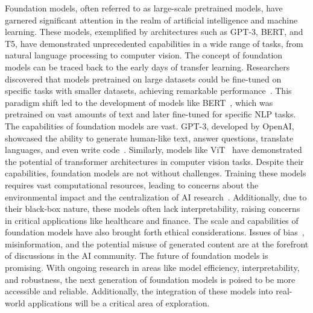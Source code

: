 \documentclass[withindex,glossary,firstyr]{cam-thesis}
\begin{document}
Foundation models, often referred to as large-scale pretrained models, have garnered significant attention in the realm of artificial intelligence and machine learning. These models, exemplified by architectures such as GPT-3, BERT, and T5, have demonstrated unprecedented capabilities in a wide range of tasks, from natural language processing to computer vision.
The concept of foundation models can be traced back to the early days of transfer learning. Researchers discovered that models pretrained on large datasets could be fine-tuned on specific tasks with smaller datasets, achieving remarkable performance~\cite{yosinski2014transferable}. This paradigm shift led to the development of models like BERT~\cite{mBERT}, which was pretrained on vast amounts of text and later fine-tuned for specific NLP tasks.
The capabilities of foundation models are vast. GPT-3, developed by OpenAI, showcased the ability to generate human-like text, answer questions, translate languages, and even write code~\cite{brown2020language}. Similarly, models like ViT~\cite{dosovitskiy2020image} have demonstrated the potential of transformer architectures in computer vision tasks.
Despite their capabilities, foundation models are not without challenges. Training these models requires vast computational resources, leading to concerns about the environmental impact and the centralization of AI research~\cite{strubell2019energy}. Additionally, due to their black-box nature, these models often lack interpretability, raising concerns in critical applications like healthcare and finance.
The scale and capabilities of foundation models have also brought forth ethical considerations. Issues of bias~\cite{StochasticParrots}, misinformation, and the potential misuse of generated content are at the forefront of discussions in the AI community.
The future of foundation models is promising. With ongoing research in areas like model efficiency, interpretability, and robustness, the next generation of foundation models is poised to be more accessible and reliable. Additionally, the integration of these models into real-world applications will be a critical area of exploration.

\end{document}
